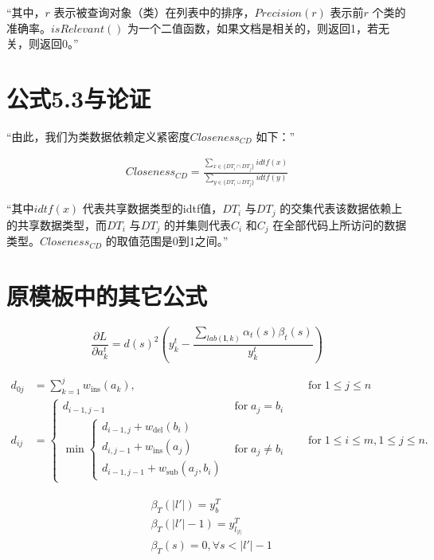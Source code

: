 “其中，$r$ 表示被查询对象（类）在列表中的排序，$Precision(r)$ 表示前$r$ 个类的准确率。$isRelevant()$ 为一个二值函数，如果文档是相关的，则返回1，若无关，则返回0。”

\section{公式5.3与论证}

“由此，我们为类数据依赖定义紧密度$Closeness_{CD}$ 如下：”

\begin{align}Closeness_{CD}=\frac {\sum _{x \in \{DT_{i}\cap DT_{j}\}}idtf(x)} {\sum _{y \in \{DT_{i}\cup DT_{j}\}}idtf(y)}\end{align}

“其中$idtf(x)$ 代表共享数据类型的idtf值，$DT_i$ 与$DT_j$ 的交集代表该数据依赖上的共享数据类型，而$DT_i$ 与$DT_j$ 的并集则代表$C_i$ 和$C_j$ 在全部代码上所访问的数据类型。$Closeness_{CD}$ 的取值范围是0到1之间。”

\section{原模板中的其它公式}

\begin{equation}
\frac{\partial L}{\partial a_{k}^t} = {d(s)}^2 (y_{k}^t - \frac{\sum_{lab(\mathbf{l},k)} \alpha_t(s)\beta_t(s) }{y_{k}^t} )
\end{equation}

\begin{equation}
\begin{aligned}
d_{{0j}}&=\sum _{{k=1}}^{{j}}w_{{\mathrm  {ins}}}(a_{{k}}),\quad &{\text{for}}\;1\leq j\leq n\\
d_{{ij}}&={\begin{cases}d_{{i-1,j-1}}&{\text{for}}\;a_{{j}}=b_{{i}}\\\min {\begin{cases}d_{{i-1,j}}+w_{{\mathrm  {del}}}(b_{{i}})\\d_{{i,j-1}}+w_{{\mathrm  {ins}}}(a_{{j}})\\d_{{i-1,j-1}}+w_{{\mathrm  {sub}}}(a_{{j}},b_{{i}})\end{cases}}&{\text{for}}\;a_{{j}}\neq b_{{i}}\end{cases}}\quad &{\text{for}}\;1\leq i\leq m,1\leq j\leq n.
\end{aligned}
\end{equation}

\begin{equation}
\begin{aligned}
&\beta_T(|l{}'|)=y_{b}^{T}\\
&\beta_T(|l{}'|-1)=y_{l_|l|}^{T} \\
&\beta_T(s)=0, \forall s < |l{}'|-1
\end{aligned}
\end{equation}

